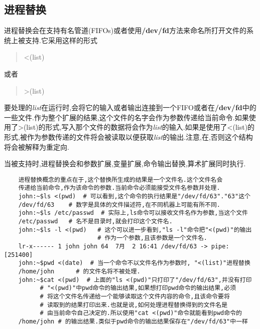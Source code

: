 \documentclass[draft,openany]{book}
\begin{document}
\begin{CJK}{UTF8}{gbsn}
    \subsection{进程替换}
    进程替换会在支持有名管道(FIFOs)或者使用\textbf{/dev/fd}方法来命名所打开文件的系统上被支持.它采用这样的形式
    \begin{quote}
        \textless(list)
    \end{quote}
    或者
    \begin{quote}
        \textgreater(list)
    \end{quote}
    要处理的\emph{list}在运行时,会将它的输入或者输出连接到一个FIFO或者在\textbf{/dev/fd}中的一些文件.作为整个扩展的结果,这个文件的名字会作为参数传递给当前命令.如果使用了\textgreater(list)的形式,写入那个文件的数据将会作为\emph{list}的输入.如果是使用了\textless(list)的形式,被作为参数传递的文件将会被读取以便获取\emph{list}的输出.注意,在,否则这个结构将会被解释为重定向.\par
    当被支持时,进程替换会和参数扩展,变量扩展,命令输出替换,算术扩展同时执行.
    \begin{verbatim}
    进程替换概念的重点在于,这个替换所生成的结果是一个文件名.这个文件名会
    传递给当前命令,作为该命令的参数.当前命令必须能接受文件名参数并处理.
    john:~$ls <(pwd)  # 可以看到,这个命令的执行结果是"/dev/fd/63"."63"这个
    /dev/fd/63    # 数字是具体的文件描述符,在不同机器上可能有所不同.
    john:~$ls /etc/passwd  # 实际上,ls命令可以接收文件名作为参数,当这个文件
    /etc/passwd   # 名不是目录时,就会打印这个文件名.
    john:~$ls -l <(pwd)   # 这个可以进一步看到,"ls -l"命令把"<(pwd)"的输出
                          # 作为一个参数,且该参数是一个文件名.
    lr-x------ 1 john john 64  7月  2 16:41 /dev/fd/63 -> pipe:[251400]
    john:~$pwd <(date)  # 当一个命令不以文件名作为参数时, "<(list)"进程替换
    /home/john      # 的文件名将不被处理.
    john:~$cat <(pwd)  # 上面的"ls <(pwd)"只打印了"/dev/fd/63",并没有打印
          # "<(pwd)"中pwd命令的输出结果,如果想打印pwd命令的输出结果,必须
          # 将这个文件名传递给一个能够读取这个文件内容的命令,且该命令要将
          # 读取到的结果打印出来.也就是说,如何处理进程替换得到的文件名是
          # 由当前命令自己决定的.所以使用"cat <(pwd)"命令就能看到pwd命令的
    /home/john # 的输出结果.类似于pwd命令的输出结果保存在"/dev/fd/63"中一样


\end{verbatim}
\end{CJK}
\end{document}
